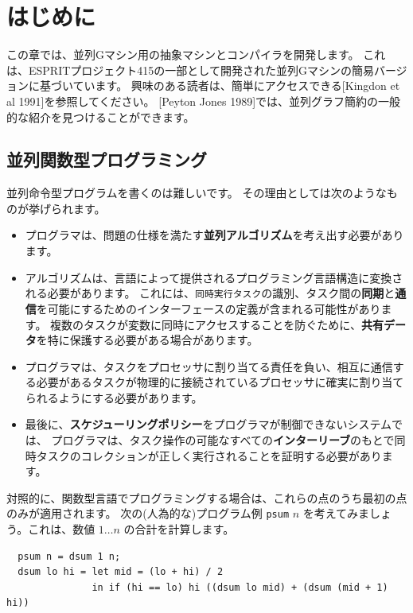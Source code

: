 \documentclass{jbook}
\begin{document}
\section{はじめに}

この章では、並列Gマシン用の抽象マシンとコンパイラを開発します。
これは、ESPRITプロジェクト415の一部として開発された並列Gマシンの簡易バージョンに基づいています。
興味のある読者は、簡単にアクセスできる[Kingdon et al 1991]を参照してください。
[Peyton Jones 1989]では、並列グラフ簡約の一般的な紹介を見つけることができます。

\subsection{並列関数型プログラミング}

並列命令型プログラムを書くのは難しいです。 その理由としては次のようなものが挙げられます。

\begin{itemize}
	\item プログラマは、問題の仕様を満たす\textbf{並列アルゴリズム}を考え出す必要があります。
	\item アルゴリズムは、言語によって提供されるプログラミング言語構造に変換される必要があります。
	      これには、\texttt{同時実行タスク}の識別、タスク間の\textbf{同期}と\textbf{通信}を可能にするためのインターフェースの定義が含まれる可能性があります。
	      複数のタスクが変数に同時にアクセスすることを防ぐために、\textbf{共有データ}を特に保護する必要がある場合があります。
	\item プログラマは、タスクをプロセッサに割り当てる責任を負い、相互に通信する必要があるタスクが物理的に接続されているプロセッサに確実に割り当てられるようにする必要があります。
	\item 最後に、\textbf{スケジューリングポリシー}をプログラマが制御できないシステムでは、
	      プログラマは、タスク操作の可能なすべての\textbf{インターリーブ}のもとで同時タスクのコレクションが正しく実行されることを証明する必要があります。
\end{itemize}

対照的に、関数型言語でプログラミングする場合は、これらの点のうち最初の点のみが適用されます。
次の(人為的な)プログラム例 \texttt{psum} $n$ を考えてみましょう。これは、数値 $1 \ldots n$ の合計を計算します。

\begin{verbatim}
  psum n = dsum 1 n;
  dsum lo hi = let mid = (lo + hi) / 2
               in if (hi == lo) hi ((dsum lo mid) + (dsum (mid + 1) hi))
\end{verbatim}
\end{document}
